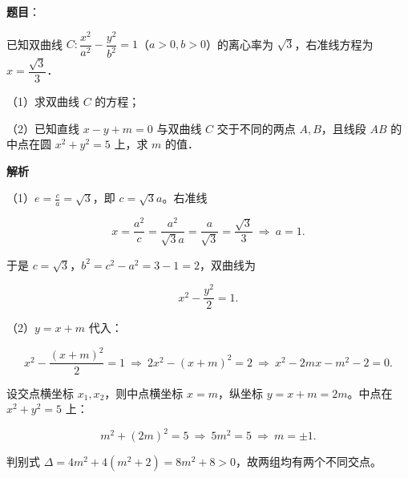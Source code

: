 \begin{answer}

\textbf{题目}：

已知双曲线 $C:\dfrac{x^2}{a^2}-\dfrac{y^2}{b^2}=1$（$a>0,b>0$）的离心率为 $\sqrt3$，右准线方程为 $x=\dfrac{\sqrt3}{3}$．

（1）求双曲线 $C$ 的方程；

（2）已知直线 $x-y+m=0$ 与双曲线 $C$ 交于不同的两点 $A,B$，且线段 $AB$ 的中点在圆 $x^2+y^2=5$ 上，求 $m$ 的值．

\textbf{解析}

（1）$e=\frac ca=\sqrt3$，即 $c=\sqrt3a$。右准线

\nopagebreak[4]
\[x=\frac{a^2}{c}=\frac{a^2}{\sqrt3a}=\frac a{\sqrt3}=\frac{\sqrt3}{3}
\ \Longrightarrow\ a=1 .\]

于是 $c=\sqrt3$，$b^2=c^2-a^2=3-1=2$，双曲线为

\nopagebreak[4]
\[x^2-\frac{y^2}{2}=1 .\]

（2）$y=x+m$ 代入：

\nopagebreak[4]
\[x^2-\frac{(x+m)^2}{2}=1
\ \Longrightarrow\ 2x^2-(x+m)^2=2
\ \Longrightarrow\ x^2-2mx-m^2-2=0 .\]

设交点横坐标 $x_1,x_2$，则中点横坐标 $x=m$，纵坐标 $y=x+m=2m$。中点在 $x^2+y^2=5$ 上：

\nopagebreak[4]
\[m^2+(2m)^2=5\ \Longrightarrow\ 5m^2=5\ \Longrightarrow\ m=\pm1 .\]

判别式 $\Delta=4m^2+4(m^2+2)=8m^2+8>0$，故两组均有两个不同交点。


\end{answer}
